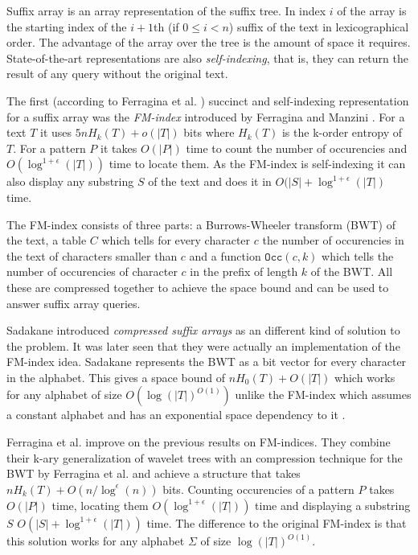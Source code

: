 \documentclass[11pt]{article}
\newcommand{\bigo}{O}
\newcommand{\smallo}{o}
\begin{document}
Suffix array is an array representation of the suffix tree. In index
$i$ of the array is the starting index of the $i+1$th (if $0 \le i <
n$) suffix of the text in lexicographical order. The advantage of the
array over the tree is the amount of space it requires.
State-of-the-art representations are also \emph{self-indexing}, that
is, they can return the result of any query without the original text.

The first (according to Ferragina et al. \cite{ferragina07}) succinct
and self-indexing representation for a suffix array was the
\emph{FM-index} introduced by Ferragina and Manzini
\cite{ferragina05}. For a text $T$ it uses $5nH_k(T) + \smallo(|T|)$
bits where $H_k(T)$ is the k-order entropy of $T$. For a pattern $P$
it takes $\bigo(|P|)$ time to count the number of occurencies and
$\bigo(\log^{1+\epsilon}(|T|))$ time to locate them. As the FM-index
is self-indexing it can also display any substring $S$ of the text and
does it in $\bigo(|S| + \log^{1+\epsilon}(|T|)$ time.

The FM-index consists of three parts: a Burrows-Wheeler transform
\cite{burrows94} (BWT) of the text, a table $C$ which tells for every
character $c$ the number of occurencies in the text of characters
smaller than $c$ and a function $\texttt{Occ}(c,k)$ which tells the
number of occurencies of character $c$ in the prefix of length $k$ of
the BWT. All these are compressed together to achieve the space bound
and can be used to answer suffix array queries.

Sadakane introduced \emph{compressed suffix arrays} \cite{sadakane02}
as an different kind of solution to the problem. It was later seen
that they were actually an implementation of the FM-index idea.
Sadakane represents the BWT as a bit vector for every character in the
alphabet. This gives a space bound of $nH_0(T) + \bigo(|T|)$ which
works for any alphabet of size $\bigo(\log(|T|)^{\bigo(1)})$ unlike
the FM-index which assumes a constant alphabet and has an exponential
space dependency to it \cite{ferragina07}.

Ferragina et al. improve \cite{ferragina07} on the previous results on
FM-indices. They combine their k-ary generalization of wavelet trees
with an compression technique for the BWT by Ferragina et al.
\cite{ferragina05} and achieve a structure that takes $nH_k(T) +
\bigo(n / \log^{\epsilon}(n))$ bits. Counting occurencies of a pattern
$P$ takes $\bigo(|P|)$ time, locating them
$\bigo(\log^{1+\epsilon}(|T|))$ time and displaying a substring $S$
$\bigo(|S| + \log^{1+\epsilon}(|T|))$ time. The difference to the
original FM-index is that this solution works for any alphabet
$\Sigma$ of size $\log(|T|)^{\bigo(1)}$.



\end{document}
